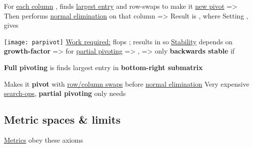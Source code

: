 \begin{itemize}

      \vItem
            For \ul{each column} , finds \ul{largest entry} and {row-swaps} to make
            it \ul{new pivot} => 
      \vItem
            Then performs \ul{normal elimination} on that column => 
      \vItem
            Result is ,
            where 
      \vItem
            Setting
            ,
             gives 

            \texttt{[image: parpivot]}
      \vItem
            \ul{Work required:}  flops
            ; results in  so 
      \vItem
            \ul{Stability} depends on \textbf{growth-factor}
            => for \ul{partial pivoting} 
      \vItem
             =>
            ,
            => only \textbf{backwards stable} if 
\end{itemize}

\hSep %

\textbf{Full pivoting} is  finds largest entry in \textbf{bottom-right submatrix}
\begin{itemize}
      \vItem
            Makes it \textbf{pivot} with \ul{row/column swaps} before \ul{normal elimination}
      \vItem
            Very expensive  \ul{search-ops}, \textbf{partial pivoting} only needs 
\end{itemize}


\subsection*{Metric spaces \& limits}

\ul{Metrics} obey these axioms


